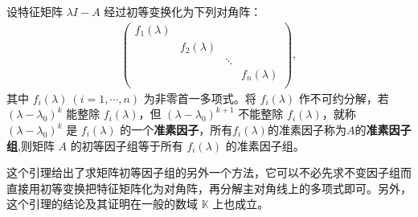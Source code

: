 \documentclass[../../main.tex]{subfiles}%
\begin{document}
\begin{lemma}\label{lemma:初等因子组等于准素因子组}
设特征矩阵 $\lambda I - A$ 经过初等变换化为下列对角阵：
\begin{align}\label{equation7629}
\left( \begin{matrix}
f_1(\lambda )&		&		&		\\
&		f_2(\lambda )&		&		\\
&		&		\ddots&		\\
&		&		&		f_n(\lambda )\\
\end{matrix} \right) ,
\end{align}
其中 $f_i(\lambda)\ (i = 1,\cdots,n)$ 为非零首一多项式。将 $f_i(\lambda)$ 作不可约分解，若 $(\lambda - \lambda_0)^k$ 能整除 $f_i(\lambda)$，但 $(\lambda - \lambda_0)^{k + 1}$ 不能整除 $f_i(\lambda)$，就称 $(\lambda - \lambda_0)^k$ 是 $f_i(\lambda)$ 的一个\textbf{准素因子}，所有$f_i(\lambda)$的准素因子称为$A$的\textbf{准素因子组},则矩阵 $A$ 的初等因子组等于所有 $f_i(\lambda)$ 的准素因子组。
\end{lemma}
\begin{remark}
这个引理给出了求矩阵初等因子组的另外一个方法，它可以不必先求不变因子组而直接用初等变换把特征矩阵化为对角阵，再分解主对角线上的多项式即可。另外，这个引理的结论及其证明在一般的数域 $\mathbb{K}$ 上也成立。 
\end{remark}
\end{document}
